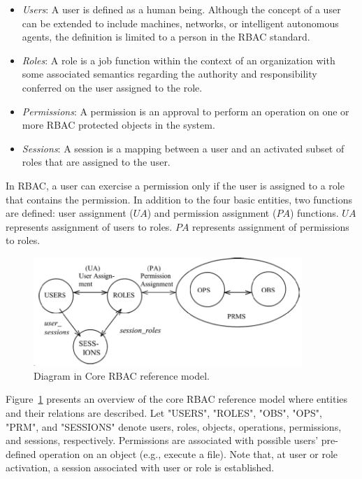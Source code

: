 \begin{itemize}
\setlength{\itemsep}{0.25pt}
\item \emph{Users}: A user is defined as a human being. Although the concept of a user can be extended to include machines, networks, or intelligent autonomous agents, the definition is limited to a person in the RBAC standard. 
\item \emph{Roles}: A role is a job function within the context of an organization with some associated semantics regarding the authority and responsibility conferred on the user assigned to the role.
\item \emph{Permissions}: A permission is an approval to perform an operation on one or more RBAC protected objects in the system.
\item \emph{Sessions}: A session is a mapping between a user and an activated subset of roles that are assigned to the user.
\end{itemize}

In RBAC, a user can exercise a permission only if the user is assigned to a role that contains the permission.
In addition to the four basic entities, two functions are defined:
user assignment ($UA$) and permission assignment ($PA$) functions.
$UA$ represents assignment of users to roles.
$PA$ represents assignment of permissions to roles.

\begin{figure}[ht]
    \centering
        \includegraphics[width=4.0in]{sections/core-model.png}
    \caption{\label{fig:overview}Diagram in Core RBAC reference model\cite{ferraiolokuhn}.}
\end{figure}

Figure~\ref{fig:overview} presents an overview of the core RBAC reference model where entities and their relations are described.
Let "USERS", "ROLES", "OBS", "OPS", "PRM", and "SESSIONS" denote users, roles, objects, operations, permissions, and sessions, respectively.
Permissions are associated with possible users' pre-defined operation on an object (e.g., execute a file).
Note that, at user or role activation, a session associated with user or role is established.


